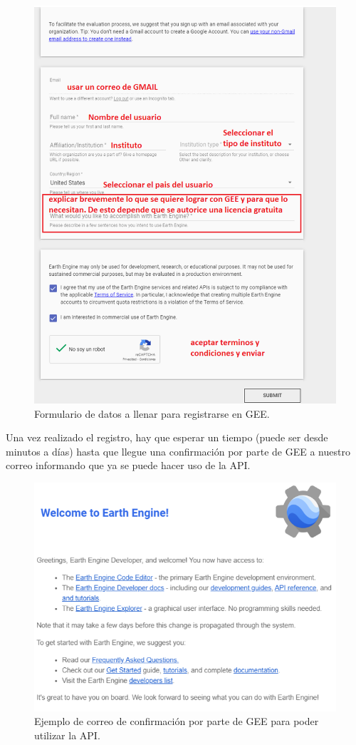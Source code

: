 \documentclass[
  12pt,
  letterpaper,
  twoside]{book}
\begin{document}
\begin{figure}

{\centering \includegraphics[width=0.6\linewidth]{Img/formulario} 

}

\caption{Formulario de datos a llenar para registrarse en GEE.}\label{fig:unnamed-chunk-3}
\end{figure}

Una vez realizado el registro, hay que esperar un tiempo (puede ser desde minutos a días) hasta que llegue una confirmación por parte de GEE a nuestro correo informando que ya se puede hacer uso de la API.

\begin{figure}

{\centering \includegraphics[width=0.6\linewidth]{Img/correo} 

}

\caption{Ejemplo de correo de confirmación por parte de GEE para poder utilizar la API.}\label{fig:unnamed-chunk-4}
\end{figure}
\end{document}
